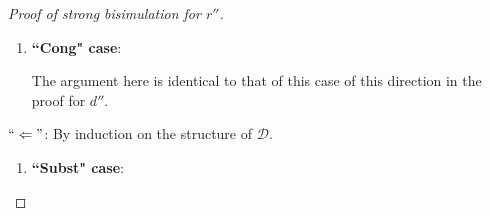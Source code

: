 \begin{proof}[Proof of strong bisimulation for $r''$]
\begin{enumerate}
\begin{itemize}
From here, the argument proceeds analogously to that of $`` \Rightarrow "$, ``Subst" case, Case 1, in the proof for $d''$.

\item \underline{Case 2}: $q$ is hole pattern without arguments or where the first argument has codata type:

Then the equation is left unchanged by $r''$ except for refunctionalizing the right-hand term, as can be seen directly in the definition of $r''$ (last set in the highest-level union). Proceed as in Case 1.

\item \underline{Case 3}: $q$ is hole pattern and has a first argument with data type:

Then the function definition that contains $`` q = s' "$ contains only equations where the left-hand side is a hole pattern (other cases are excluded by the relevant input fragment for $d''$), and it has a first argument with data type. Thus $s$ reduces to $t$ already with respect to the part of the program that is passed to $des\_conv$, and then the result of this to $r^{core}$, as specified in the definition of $r''$. Let the part passed to $des\_conv$ be $prg'$; it is: $s \longrightarrow_{prg'} t$.

By (*) we have

\begin{equation*}
s \longrightarrow_{prg'} t \iff \langle s \rangle \longrightarrow_{\langle prg' \rangle^{r^{core}}} \langle t \rangle,
\end{equation*}

But this program $\langle prg' \rangle^{r^{core}}$ is a subset of $\langle prg \rangle$, as can be seen in the definition of $r''$. Thus we have the desired $\langle s \rangle \longrightarrow_{\langle prg \rangle} \langle t \rangle$.

\end{itemize}

\item \textbf{``Cong" case}:

The argument here is identical to that of this case of this direction in the proof for $d''$.

\end{enumerate}

$`` \Leftarrow "$: By induction on the structure of $\mathcal{D}$.

\begin{enumerate}
\item \textbf{``Subst" case}:


\end{enumerate}
\end{proof}
